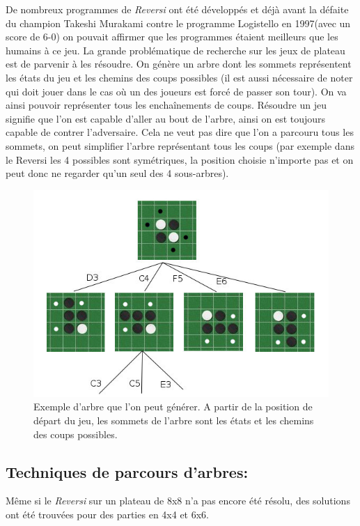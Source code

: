 \documentclass[12pt]{article}
\begin{document}
De nombreux programmes de \textit{Reversi} ont été développés et déjà avant la défaite du champion Takeshi Murakami contre le programme Logistello en 1997(avec un score de 6-0) on pouvait affirmer que les programmes étaient meilleurs que les humains à ce jeu. La grande problématique de recherche sur les jeux de plateau est de parvenir à les résoudre. On génère un arbre dont les sommets représentent les états du jeu et les chemins des coups possibles (il est aussi nécessaire de noter qui doit jouer dans le cas où un des joueurs est forcé de passer son tour). On va ainsi pouvoir représenter tous les enchaînements de coups. Résoudre un jeu signifie que l'on est capable d'aller au bout de l'arbre, ainsi on est toujours capable de contrer l'adversaire. Cela ne veut pas dire que l'on a parcouru tous les sommets, on peut simplifier l'arbre représentant tous les coups (par exemple dans le Reversi les 4 possibles sont symétriques, la position choisie n'importe pas et on peut donc ne regarder qu'un seul des 4 sous-arbres).
\begin{figure}[H]
\includegraphics[scale=0.6]{exemple_arbre.jpg}
\centering
\caption{Exemple d'arbre que l'on peut générer. A partir de la position de départ du jeu, les sommets de l'arbre sont les états et les chemins des coups possibles.}
\label{config_depart}
\end{figure}

\subsection{Techniques de parcours d'arbres:}
Même si le \textit{Reversi} sur un plateau de 8x8 n'a pas encore été résolu, des solutions ont été trouvées pour des parties en 4x4 et 6x6\cite{sol6x6}.
\end{document}
